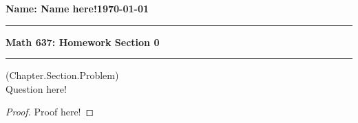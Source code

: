 \documentclass{exam}
\begin{document}
\noindent \textbf{Name: Name here!}\hfill \textbf{\today}

\vspace{.3cm}
\hrule 
\begin{center}
{\bf \Large{Math 637: Homework Section 0}}
\end{center}
\hrule
\vspace{.3cm}


\begin{questions}
\question(Chapter.Section.Problem)\\
Question here!

\begin{proof}
Proof here!
\end{proof}

\end{questions}
\end{document}
